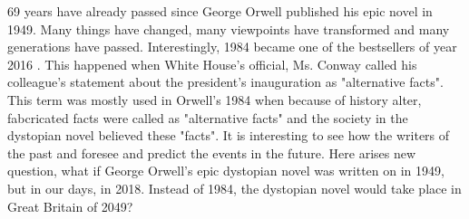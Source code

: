 \documentclass[a4paper,12pt]{article}
\begin{document}
69 years have already passed since George Orwell published his epic novel in 1949. Many things have changed, many viewpoints have transformed and many generations have passed. Interestingly, 1984 became one of the bestsellers of year 2016 \cite{bestseller}. This happened when White House's official, Ms. Conway called his colleague's statement about the president's inauguration as "alternative facts". This term was mostly used in Orwell's 1984 when because of history alter, fabcricated facts were called as "alternative facts" and the society in the dystopian novel believed these "facts". It is interesting to see how the writers of the past and foresee and predict the events in the future. Here arises new question, what if George Orwell's epic dystopian novel was written on in 1949, but in our days, in 2018. Instead of 1984, the dystopian novel would take place in Great Britain of 2049?\\

\newpage


\end{document}
